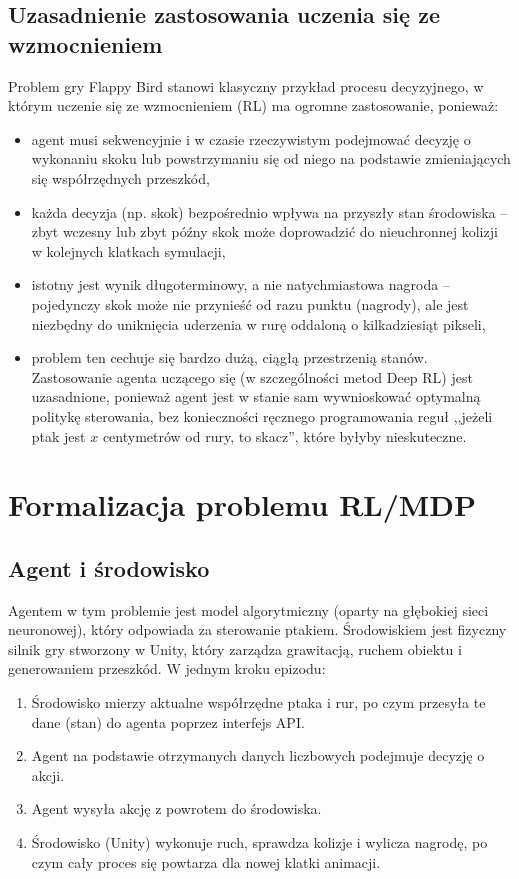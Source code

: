 \documentclass[12pt]{article}
\begin{document}
\subsection{Uzasadnienie zastosowania uczenia się ze wzmocnieniem}

Problem gry Flappy Bird stanowi klasyczny przykład procesu decyzyjnego, w którym uczenie się ze wzmocnieniem (RL) ma ogromne zastosowanie, ponieważ:
\begin{itemize}
    \item agent musi sekwencyjnie i w czasie rzeczywistym podejmować decyzję o wykonaniu skoku lub powstrzymaniu się od niego na podstawie zmieniających się współrzędnych przeszkód,
    \item każda decyzja (np. skok) bezpośrednio wpływa na przyszły stan środowiska -- zbyt wczesny lub zbyt późny skok może doprowadzić do nieuchronnej kolizji w kolejnych klatkach symulacji,
    \item istotny jest wynik długoterminowy, a nie natychmiastowa nagroda -- pojedynczy skok może nie przynieść od razu punktu (nagrody), ale jest niezbędny do uniknięcia uderzenia w rurę oddaloną o kilkadziesiąt pikseli,
    \item problem ten cechuje się bardzo dużą, ciągłą przestrzenią stanów. Zastosowanie agenta uczącego się (w szczególności metod Deep RL) jest uzasadnione, ponieważ agent jest w stanie sam wywnioskować optymalną politykę sterowania, bez konieczności ręcznego programowania reguł ,,jeżeli ptak jest $x$ centymetrów od rury, to skacz'', które byłyby nieskuteczne.
\end{itemize}

\section{Formalizacja problemu RL/MDP}

\subsection{Agent i środowisko}

Agentem w tym problemie jest model algorytmiczny (oparty na głębokiej sieci neuronowej), który odpowiada za sterowanie ptakiem. Środowiskiem jest fizyczny silnik gry stworzony w Unity, który zarządza grawitacją, ruchem obiektu i generowaniem przeszkód. W jednym kroku epizodu:
\begin{enumerate}
    \item Środowisko mierzy aktualne współrzędne ptaka i rur, po czym przesyła te dane (stan) do agenta poprzez interfejs API.
    \item Agent na podstawie otrzymanych danych liczbowych podejmuje decyzję o akcji.
    \item Agent wysyła akcję z powrotem do środowiska.
    \item Środowisko (Unity) wykonuje ruch, sprawdza kolizje i wylicza nagrodę, po czym cały proces się powtarza dla nowej klatki animacji.
\end{enumerate}
\end{document}
